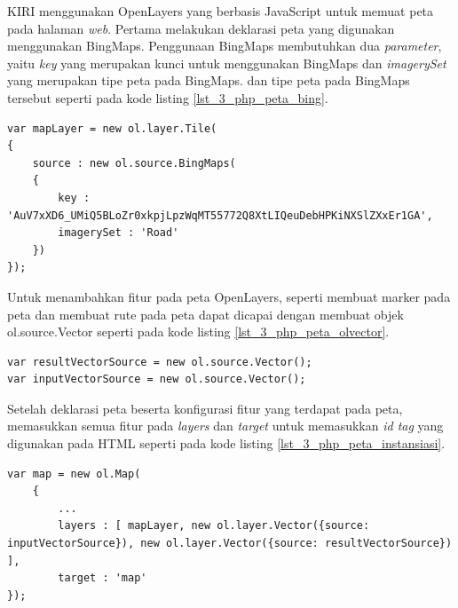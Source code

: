 KIRI menggunakan OpenLayers yang berbasis JavaScript untuk memuat peta pada halaman \textit{web}. Pertama melakukan deklarasi peta yang digunakan menggunakan BingMaps. Penggunaan BingMaps membutuhkan dua \textit{parameter}, yaitu \textit{key} yang merupakan kunci untuk menggunakan BingMaps dan \textit{imagerySet} yang merupakan tipe peta pada BingMaps. dan tipe peta pada BingMaps tersebut seperti pada kode listing \ref{lst_3_php_peta_bing}.

\begin{lstlisting}[caption=Deklarasi peta BingMaps,label = {lst_3_php_peta_bing}]
var mapLayer = new ol.layer.Tile(
{
	source : new ol.source.BingMaps(
	{
		key : 'AuV7xXD6_UMiQ5BLoZr0xkpjLpzWqMT55772Q8XtLIQeuDebHPKiNXSlZXxEr1GA',
		imagerySet : 'Road'
	})
});
\end{lstlisting}


Untuk menambahkan fitur pada peta OpenLayers, seperti membuat marker pada peta dan membuat rute pada peta dapat dicapai dengan membuat objek ol.source.Vector seperti pada kode listing \ref{lst_3_php_peta_olvector}.

\begin{lstlisting}[caption=Objek ol.source.Vector,label = {lst_3_php_peta_olvector}]
var resultVectorSource = new ol.source.Vector();
var inputVectorSource = new ol.source.Vector();
\end{lstlisting}

Setelah deklarasi peta beserta konfigurasi fitur yang terdapat pada peta, memasukkan semua fitur pada \textit{layers} dan \textit{target} untuk memasukkan \textit{id tag} yang digunakan pada HTML seperti pada kode listing \ref{lst_3_php_peta_instansiasi}.

\begin{lstlisting}[caption=Instansiasi peta,label = {lst_3_php_peta_instansiasi}]
var map = new ol.Map(
	{
		...
		layers : [ mapLayer, new ol.layer.Vector({source: inputVectorSource}), new ol.layer.Vector({source: resultVectorSource}) ],
		target : 'map'
});
\end{lstlisting}

